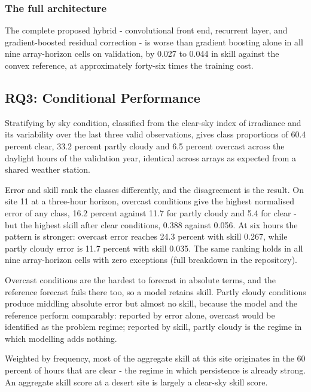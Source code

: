 \subsubsection{The full architecture}

The complete proposed hybrid - convolutional front end, recurrent layer,
and gradient-boosted residual correction - is worse than gradient
boosting alone in all nine array-horizon cells on validation, by 0.027
to 0.044 in skill against the convex reference, at approximately
forty-six times the training cost.

\subsection{RQ3: Conditional Performance}
\label{sec:rq3}

Stratifying by sky condition, classified from the clear-sky index of
irradiance and its variability over the last three valid observations,
gives class proportions of 60.4 percent clear, 33.2 percent partly
cloudy and 6.5 percent overcast across the daylight hours of the
validation year, identical across arrays as expected from a shared
weather station.

Error and skill rank the classes differently, and the disagreement is
the result. On site 11 at a three-hour horizon, overcast conditions give
the highest normalised error of any class, 16.2 percent against 11.7 for
partly cloudy and 5.4 for clear - but the highest skill after clear
conditions, 0.388 against 0.056. At six hours the pattern is stronger:
overcast error reaches 24.3 percent with skill 0.267, while partly
cloudy error is 11.7 percent with skill 0.035. The same ranking holds in
all nine array-horizon cells with zero exceptions (full breakdown in the
repository).

Overcast conditions are the hardest to forecast in absolute terms, and
the reference forecast fails there too, so a model retains skill. Partly
cloudy conditions produce middling absolute error but almost no skill,
because the model and the reference perform comparably: reported by
error alone, overcast would be identified as the problem regime;
reported by skill, partly cloudy is the regime in which modelling adds
nothing.

Weighted by frequency, most of the aggregate skill at this site
originates in the 60 percent of hours that are clear - the regime in
which persistence is already strong. An aggregate skill score at a
desert site is largely a clear-sky skill score.

